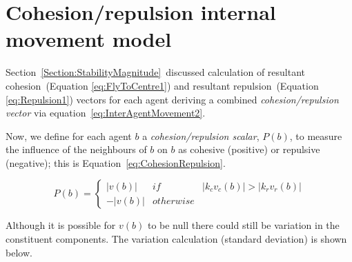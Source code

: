 \documentclass{ieeeaccess}
\begin{document}
\section{Cohesion/repulsion internal movement model}\label{Section:StabilityModel}
Section~\ref{Section:StabilityMagnitude}~discussed calculation of resultant cohesion~(Equation \ref{eq:FlyToCentre1}) and resultant repulsion~(Equation \ref{eq:Repulsion1}) vectors for each agent deriving a combined \emph{cohesion/repulsion vector} via equation~\ref{eq:InterAgentMovement2}. 


Now, we define for each agent $b$ a \emph{cohesion/repulsion scalar}, $P(b)$, to measure the influence of the neighbours of $b$ on $b$ as cohesive (positive) or repulsive (negative); this is Equation~\ref{eq:CohesionRepulsion}.

\begin{equation}
\label{eq:CohesionRepulsion}
P(b) = \left\{\begin{array}{lll}
               |v(b)|& if & |k_cv_c(b)| > |k_r v_r(b)|\\
              -|v(b)|& otherwise
              \end{array}\right.
\end{equation}

Although it is possible for $v(b)$ to be null there could still be variation in the constituent components. The variation calculation (standard deviation) is shown below. 


\end{document}
